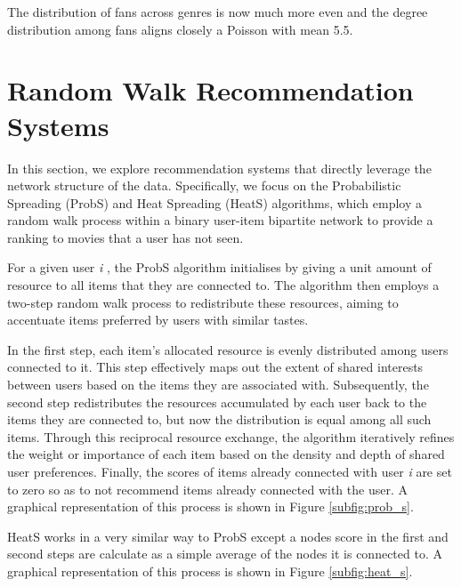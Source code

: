 \documentclass[12pt]{article}
\numberwithin{equation}{section}
\begin{document}
The distribution of fans across genres is now much more even and the degree distribution among fans aligns closely a Poisson with mean 5.5.

\section{Random Walk Recommendation Systems}

In this section, we explore recommendation systems that directly leverage the network structure of the data. Specifically, we focus on the Probabilistic Spreading (ProbS) and Heat Spreading (HeatS) algorithms, which employ a random walk process within a binary user-item bipartite network to provide a ranking to movies that a user has not seen.

For a given user \textit{i} , the ProbS algorithm initialises by giving a unit amount of resource to all items that they are connected to. The algorithm then employs a two-step random walk process to redistribute these resources, aiming to accentuate items preferred by users with similar tastes.

In the first step, each item's allocated resource is evenly distributed among users connected to it. This step effectively maps out the extent of shared interests between users based on the items they are associated with. Subsequently, the second step redistributes the resources accumulated by each user back to the items they are connected to, but now the distribution is equal among all such items. Through this reciprocal resource exchange, the algorithm iteratively refines the weight or importance of each item based on the density and depth of shared user preferences. Finally, the scores of items already connected with user \textit{i} are set to zero so as to not recommend items already connected with the user. A graphical representation of this process is shown in Figure \ref{subfig:prob_s}.

HeatS works in a very similar way to ProbS except a nodes score in the first and second steps are calculate as a simple average of the nodes it is connected to. A  graphical representation of this process is shown in Figure \ref{subfig:heat_s}.
\end{document}
